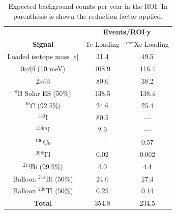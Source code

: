 \begin{table}
\centering
\begin{tabular}{ccc}
\toprule
                          & \multicolumn{2}{c}{\bf Events/ROI$\cdot$y} \\
{\bf Signal}              & Te Loading & $^{enr}$Xe Loading \\
Loaded isotope mass [t] & 31.4 & 49.5 \\
\midrule
$0\nu\beta\beta$ (10 meV) & 108.9       & 116.4      \\
\midrule
$2\nu\beta\beta$          & 80.0       & 38.2       \\
$^8$B Solar ES  (50\%)           & 138.5      & 138.4      \\
$^{10}$C  (92.5\%)                & 24.6       & 25.4       \\
$^{130}$I                 & 80.5       & ---        \\
$^{130m}$I                & 2.9        & ---        \\
$^{136}$Cs                & ---        & 0.57       \\
$^{208}$Tl                & 0.02       & 0.002      \\
$^{214}$Bi  (99.9\%)               & 4.0        & 4.4        \\
Balloon $^{214}$Bi  (50\%)       & 24.0       & 27.4       \\
Balloon $^{208}$Tl  (50\%)      & 0.25       & 0.14       \\
\midrule
{\bf Total}               & 354.8      & 234.5      \\
\bottomrule
\end{tabular}
\caption{Expected background counts per year in the ROI. In parenthesis is shown the reduction factor applied.}
\label{tab:counts}
\end{table}

